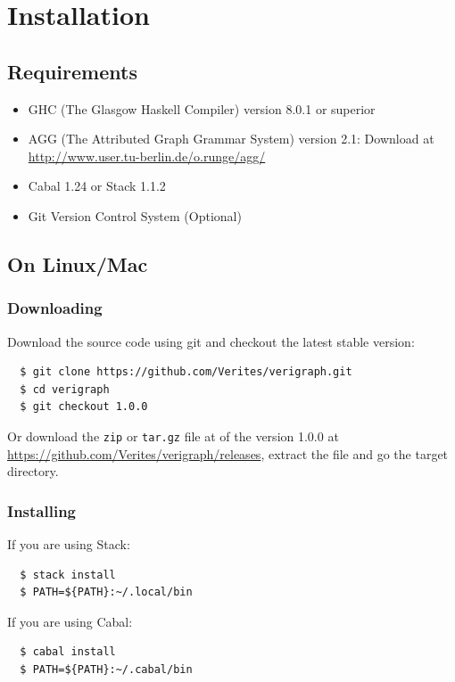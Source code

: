 \documentclass[12pt]{article}
\begin{document}
\pagebreak

\section{Installation}

\subsection{Requirements}
\begin{itemize}
\item GHC (The Glasgow Haskell Compiler) version 8.0.1 or superior
\item AGG (The Attributed Graph Grammar System) version 2.1: Download at \url{http://www.user.tu-berlin.de/o.runge/agg/}
\item Cabal 1.24 or Stack 1.1.2
\item Git Version Control System (Optional)
\end{itemize}

\subsection{On Linux/Mac}

\subsubsection{Downloading}
Download the source code using git and checkout the latest stable version:
\begin{verbatim}
  $ git clone https://github.com/Verites/verigraph.git
  $ cd verigraph
  $ git checkout 1.0.0
\end{verbatim}

\noindent
Or download the \texttt{zip} or \texttt{tar.gz} file at of the version 1.0.0 at \url{https://github.com/Verites/verigraph/releases}, extract the file and go the target directory.

\subsubsection{Installing}

If you are using Stack:
\begin{verbatim}
  $ stack install
  $ PATH=${PATH}:~/.local/bin
\end{verbatim}

\noindent
If you are using Cabal:
\begin{verbatim}
  $ cabal install
  $ PATH=${PATH}:~/.cabal/bin
\end{verbatim}
\end{document}
